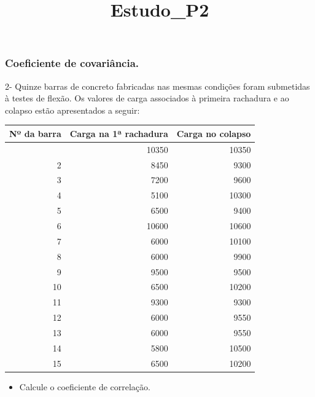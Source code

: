 \documentclass[11pt]{article}
\title{Estudo\_P2}
\providecommand{\tightlist}{%
      \setlength{\itemsep}{0pt}\setlength{\parskip}{0pt}}
\begin{document}
    
    \maketitle
    
    

    
    \subsubsection{Coeficiente de
covariância.}\label{coeficiente-de-covariuxe2ncia.}

2- Quinze barras de concreto fabricadas nas mesmas condições foram
submetidas à testes de flexão. Os valores de carga associados à primeira
rachadura e ao colapso estão apresentados a seguir:

{\def\LTcaptype{none} %
\begin{longtable}[]{@{}rrr@{}}
\toprule\noalign{}
Nº da barra & Carga na 1ª rachadura & Carga no colapso \\
\midrule\noalign{}
\endhead
\bottomrule\noalign{}
\endlastfoot
1 & 10350 & 10350 \\
2 & 8450 & 9300 \\
3 & 7200 & 9600 \\
4 & 5100 & 10300 \\
5 & 6500 & 9400 \\
6 & 10600 & 10600 \\
7 & 6000 & 10100 \\
8 & 6000 & 9900 \\
9 & 9500 & 9500 \\
10 & 6500 & 10200 \\
11 & 9300 & 9300 \\
12 & 6000 & 9550 \\
13 & 6000 & 9550 \\
14 & 5800 & 10500 \\
15 & 6500 & 10200 \\
\end{longtable}
}

\begin{itemize}
\tightlist
\item
  Calcule o coeficiente de correlação.
\end{itemize}
\end{document}
